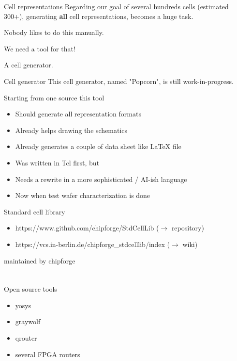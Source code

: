 \documentclass[aspectratio=169]{beamer}
\begin{document}
\begin{frame}{Cell representations}
Regarding our goal of several hundreds cells (estimated 300+), generating \textbf{all} cell representations, becomes a huge task.

Nobody likes to do this manually.

We need a tool for that!

A cell generator.

\end{frame}

\begin{frame}{Cell generator}
This cell generator, named "Popcorn", is still work-in-progress.

Starting from one source this tool

	\begin{itemize}
		\item Should generate all representation formats
		\item Already helps drawing the schematics
		\item Already generates a couple of data sheet like LaTeX file
		\item Was written in Tcl first, but
		\item Needs a rewrite in a more sophisticated / AI-ish language
		\item Now when test wafer characterization is done
	\end{itemize}
\end{frame}

\begin{frame}{Standard cell library}
	\begin{itemize}
        \setlength\itemsep{1em}
		\item https://www.github.com/chipforge/StdCellLib ($\rightarrow$ repository)
		\item https://vcs.in-berlin.de/chipforge\_stdcelllib/index ($\rightarrow$ wiki)
	\end{itemize}

maintained by chipforge
\end{frame}

\section[Silicon compiler]{}
\begin{frame}{Open source tools}
	\begin{itemize}
        \setlength\itemsep{1em}
		\item yosys
		\item graywolf
		\item qrouter
		\item several FPGA routers
	\end{itemize}
\end{frame}
\end{document}
